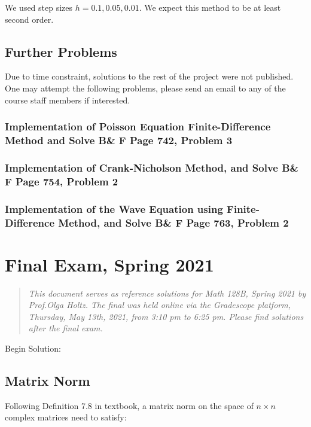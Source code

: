 \documentclass[12pt]{article} %
\newcommand{\1}[1]{\mathds{1}\left[#1\right]}
\begin{document}


We used step sizes $h = 0.1, 0.05, 0.01$. We expect this method to be at least second order.

\subsection{Further Problems}
Due to time constraint, solutions to the rest of the project were not published. One may attempt the following problems, please send an email to any of the course staff members if interested.
\subsubsection{Implementation of Poisson Equation Finite-Difference Method and Solve B\& F Page 742, Problem 3}
\subsubsection{Implementation of Crank-Nicholson Method, and Solve B\& F Page 754, Problem 2}
\subsubsection{Implementation of the Wave Equation using Finite-Difference Method, and Solve B\& F Page 763, Problem 2}












\newpage
\section{Final Exam, Spring 2021}
\begin{abstract}
	\emph{This document serves as reference solutions for Math 128B, Spring 2021 by Prof.Olga Holtz. The final was held online via the Gradescope platform, Thursday, May 13th, 2021, from 3:10 pm to 6:25 pm. Please find solutions after the final exam.}
\end{abstract}




Begin Solution:
\subsection{Matrix Norm}
Following Definition 7.8 in textbook, a matrix norm on the space of $n\times n$ complex matrices need to satisfy:
\end{document}
